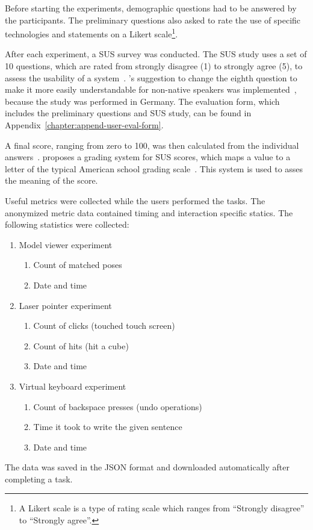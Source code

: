 Before starting the experiments, demographic questions had to be answered by the participants. The preliminary questions also asked to rate the use of specific technologies and statements on a Likert scale\footnote{A Likert scale is a type of rating scale which ranges from \enquote{Strongly disagree} to \enquote{Strongly agree}.}. 

After each experiment, a \gls{SUS} survey was conducted. The \gls{SUS} study uses a set of 10 questions, which are rated from strongly disagree (1) to strongly agree (5), to assess the usability of a system~\cite[3]{Brooke.1996}. \citeauthor{Finstad.2006}'s suggestion to change the eighth question to make it more easily understandable for non-native speakers was implemented~\cite[188]{Finstad.2006}, because the study was performed in Germany. The evaluation form, which includes the preliminary questions and \gls{SUS} study, can be found in Appendix~\ref{chapter:append-user-eval-form}.

A final score, ranging from zero to 100, was then calculated from the individual answers~\cite{Brooke.1996}. \citeauthor{Bangor.2009} proposes a grading system for \gls{SUS} scores, which maps a value to a letter of the typical American school grading scale~\cite{Bangor.2009}. This system is used to asses the meaning of the score.

Useful metrics were collected while the users performed the tasks. The anonymized metric data contained timing and interaction specific statics. The following statistics were collected:
\begin{enumerate}
  \item Model viewer experiment
  \begin{enumerate}
    \item Count of matched poses
    \item Date and time
  \end{enumerate}

  \item Laser pointer experiment
  \begin{enumerate}
    \item Count of clicks (touched touch screen)
    \item Count of hits (hit a cube)
    \item Date and time
  \end{enumerate}
  
  \item Virtual keyboard experiment
  \begin{enumerate}
    \item Count of backspace presses (undo operations)
    \item Time it took to write the given sentence
    \item Date and time
  \end{enumerate}
\end{enumerate}
The data was saved in the JSON format and downloaded automatically after completing a task.